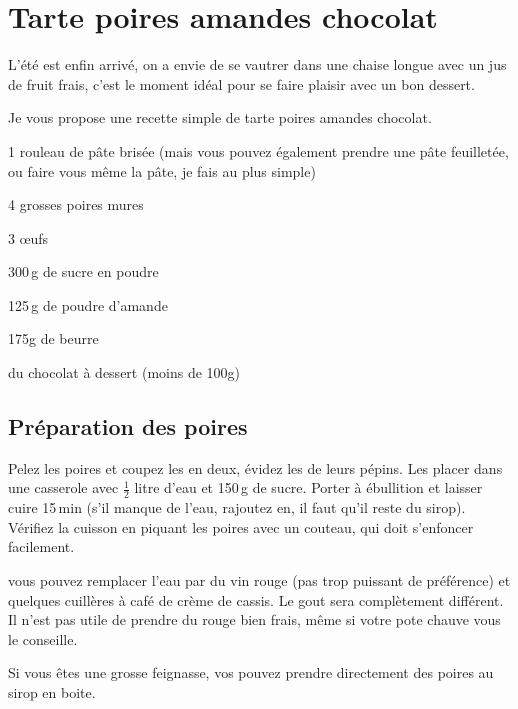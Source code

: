 \section{Tarte poires amandes chocolat}

L'été est enfin arrivé, on a envie de se vautrer dans une chaise longue avec
un jus de fruit frais, c'est le moment idéal pour se faire plaisir avec un bon
dessert.

Je vous propose une recette simple de tarte poires amandes chocolat.

\begin{ingredients}
	\item 1 rouleau de pâte brisée (mais vous pouvez également prendre une
	pâte feuilletée, ou faire vous même la pâte, je fais au plus simple)
	\item 4 grosses poires mures
	\item 3 \oe{}ufs
	\item 300\,g de sucre en poudre
	\item 125\,g de poudre d'amande
	\item 175g de beurre
	\item du chocolat à dessert (moins de 100g)
\end{ingredients}

\subsection*{Préparation des poires}

Pelez les poires et coupez les en deux, évidez les de leurs pépins. Les placer
dans une casserole avec $\frac{1}{2}$ litre d'eau et 150\,g de sucre. Porter à ébullition
et laisser cuire 15\,min (s'il manque de l'eau, rajoutez en, il faut qu'il reste
du sirop). Vérifiez la cuisson en piquant les poires avec un couteau, qui doit
s'enfoncer facilement.

	\begin{remarque}

		vous pouvez remplacer l'eau par du vin rouge (pas trop puissant de
		préférence) et quelques cuillères à café de crème de cassis. Le gout
		sera complètement différent. Il n'est pas utile de prendre du rouge
		bien frais, même si votre pote chauve vous le conseille.

	\end{remarque}

	\begin{remarque}

		Si vous êtes une grosse feignasse, vos pouvez prendre directement des
		poires au sirop en boite.

	\end{remarque}

